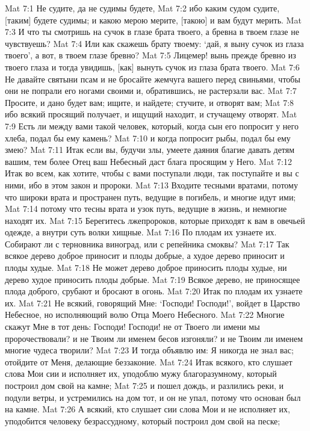 Mat 7:1  Не судите, да не судимы будете,
Mat 7:2  ибо каким судом судите, [таким] будете судимы; и какою мерою мерите, [такою] и вам будут мерить.
Mat 7:3  И что ты смотришь на сучок в глазе брата твоего, а бревна в твоем глазе не чувствуешь?
Mat 7:4  Или как скажешь брату твоему: `дай, я выну сучок из глаза твоего', а вот, в твоем глазе бревно?
Mat 7:5  Лицемер! вынь прежде бревно из твоего глаза и тогда увидишь, [как] вынуть сучок из глаза брата твоего.
Mat 7:6  Не давайте святыни псам и не бросайте жемчуга вашего перед свиньями, чтобы они не попрали его ногами своими и, обратившись, не растерзали вас.
Mat 7:7  Просите, и дано будет вам; ищите, и найдете; стучите, и отворят вам;
Mat 7:8  ибо всякий просящий получает, и ищущий находит, и стучащему отворят.
Mat 7:9  Есть ли между вами такой человек, который, когда сын его попросит у него хлеба, подал бы ему камень?
Mat 7:10  и когда попросит рыбы, подал бы ему змею?
Mat 7:11  Итак если вы, будучи злы, умеете даяния благие давать детям вашим, тем более Отец ваш Небесный даст блага просящим у Него.
Mat 7:12  Итак во всем, как хотите, чтобы с вами поступали люди, так поступайте и вы с ними, ибо в этом закон и пророки.
Mat 7:13  Входите тесными вратами, потому что широки врата и пространен путь, ведущие в погибель, и многие идут ими;
Mat 7:14  потому что тесны врата и узок путь, ведущие в жизнь, и немногие находят их.
Mat 7:15  Берегитесь лжепророков, которые приходят к вам в овечьей одежде, а внутри суть волки хищные.
Mat 7:16  По плодам их узнаете их. Собирают ли с терновника виноград, или с репейника смоквы?
Mat 7:17  Так всякое дерево доброе приносит и плоды добрые, а худое дерево приносит и плоды худые.
Mat 7:18  Не может дерево доброе приносить плоды худые, ни дерево худое приносить плоды добрые.
Mat 7:19  Всякое дерево, не приносящее плода доброго, срубают и бросают в огонь.
Mat 7:20  Итак по плодам их узнаете их.
Mat 7:21  Не всякий, говорящий Мне: `Господи! Господи!', войдет в Царство Небесное, но исполняющий волю Отца Моего Небесного.
Mat 7:22  Многие скажут Мне в тот день: Господи! Господи! не от Твоего ли имени мы пророчествовали? и не Твоим ли именем бесов изгоняли? и не Твоим ли именем многие чудеса творили?
Mat 7:23  И тогда объявлю им: Я никогда не знал вас; отойдите от Меня, делающие беззаконие.
Mat 7:24  Итак всякого, кто слушает слова Мои сии и исполняет их, уподоблю мужу благоразумному, который построил дом свой на камне;
Mat 7:25  и пошел дождь, и разлились реки, и подули ветры, и устремились на дом тот, и он не упал, потому что основан был на камне.
Mat 7:26  А всякий, кто слушает сии слова Мои и не исполняет их, уподобится человеку безрассудному, который построил дом свой на песке;
